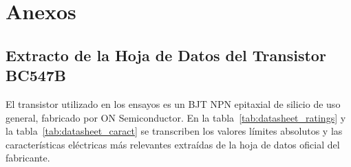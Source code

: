 \chapter{Anexos}
\label{chap:anexos}

\section{Extracto de la Hoja de Datos del Transistor BC547B}

El transistor utilizado en los ensayos es un BJT NPN epitaxial de silicio de uso general, fabricado por ON
Semiconductor. En la tabla~\ref{tab:datasheet_ratings} y la tabla~\ref{tab:datasheet_caract} se transcriben los valores
límites absolutos y las características eléctricas más relevantes extraídas de la hoja de datos oficial del fabricante.

\begin{table}[!ht]
  \centering
  \caption{Límites máximos absolutos de operación del transistor BC547B (ON Semiconductor).}
  \label{tab:datasheet_ratings}
\end{table}

